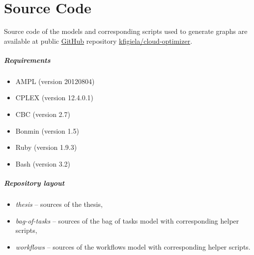 \chapter{Source Code} %

\label{AppendixA}

Source code of the models and corresponding scripts used to generate graphs are available at public \href{https://github.com}{GitHub} repository \href{https://github.com/kfigiela/cloud-optimizer}{kfigiela/cloud-optimizer}. 

\paragraph{Requirements}

\begin{itemize}
  \item AMPL (version 20120804)
  \item CPLEX (version 12.4.0.1)
  \item CBC (version 2.7)
  \item Bonmin (version 1.5)
  \item Ruby (version 1.9.3)
  \item Bash (version 3.2)
\end{itemize}

\paragraph{Repository layout}

\begin{itemize}
  \item \emph{thesis} -- sources of the thesis, 
  \item \emph{bag-of-tasks} -- sources of the bag of tasks model with corresponding helper scripts,
  \item \emph{workflows} -- sources of the workflows model with corresponding helper scripts.
\end{itemize}
